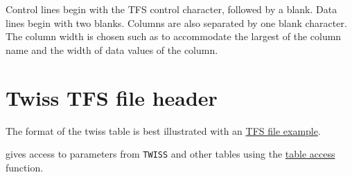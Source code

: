 Control lines begin with the TFS control character, followed by a
blank. Data lines begin with two blanks. Columns are also separated by
one blank character. The column width is chosen such as to accommodate
the largest of the column name and the width of data values of the column.  



\section{Twiss TFS file header}
\label{sec:tfs_twiss}
 
The format of the twiss table is best illustrated with an
\href{select.html#tfs}{TFS file example}.  

\madx gives access to parameters from \texttt{TWISS} and other tables using the
\href{../Introduction/expression.html#table}{table access} function.  


